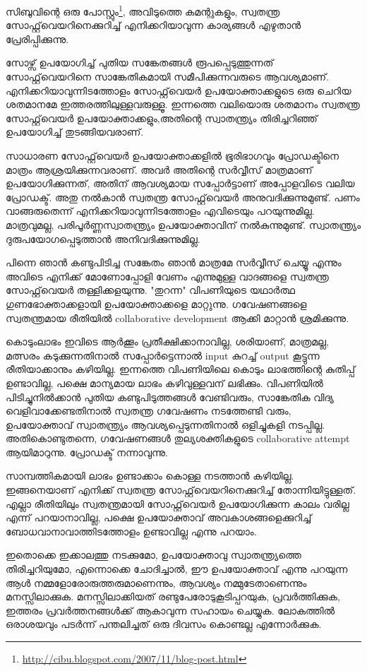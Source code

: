 \vskip 2pt

സിബുവിന്റെ ഒരു പോസ്റ്റും\footnote{\url{http://cibu.blogspot.com/2007/11/blog-post.html}}, അവിടുത്തെ കമന്റുകളും, സ്വതന്ത്ര സോഫ്റ്റ്‌വെയറിനെക്കുറിച്ച് എനിക്കറിയാവുന്ന കാര്യങ്ങള്‍ എഴുതാന്‍ പ്രേരിപ്പിക്കുന്നു.

സോഴ്സ് ഉപയോഗിച്ച് പുതിയ സങ്കേതങ്ങള്‍ രൂപപ്പെടുത്തുന്നത് സോഫ്റ്റ്‌വെയറിനെ സാങ്കേതികമായി സമീപിക്കുന്നവരുടെ ആവശ്യമാണ്. എനിക്കറിയാവുന്നിടത്തോളം സോഫ്റ്റ്‌വെയര്‍ ഉപയോക്താക്കളുടെ ഒരു ചെറിയ ശതമാനമേ ഇത്തരത്തിലുള്ളവരുള്ളൂ. ഇന്നത്തെ വലിയൊരു ശതമാനം സ്വതന്ത്ര സോഫ്റ്റ്‌വെയര്‍ ഉപയോക്താക്കളും,അതിന്റെ സ്വാതന്ത്ര്യം തിരിച്ചറിഞ്ഞ് ഉപയോഗിച്ച് തുടങ്ങിയവരാണ്.

സാധാരണ സോഫ്റ്റ്‌വെയര്‍ ഉപയോക്താക്കളില്‍ ഭൂരിഭാഗവും പ്രോഡക്ടിനെ മാത്രം ആശ്രയിക്കുന്നവരാണ്. അവര്‍ അതിന്റെ സര്‍വ്വീസ് മാത്രമാണ് ഉപയോഗിക്കുന്നത്, അതിന് ആവശ്യമായ സപ്പോര്‍ട്ടാണ് അപ്പോളവിടെ വലിയ പ്രോഡക്ട്. അതു നല്‍കാന്‍ സ്വതന്ത്ര സോഫ്റ്റ്‌വെയര്‍ അനുവദിക്കുന്നുമുണ്ട്. പണം വാങ്ങരുതെന്ന് എനിക്കറിയാവുന്നിടത്തോളം എവിടെയും പറയുന്നുമില്ല. മാത്രവുമല്ല, പരിപൂര്‍ണ്ണസ്വാതന്ത്ര്യം ഉപയോക്താവിന് നല്‍കുന്നുമുണ്ട്. സ്വാതന്ത്ര്യം ദുരുപയോഗപ്പെടുത്താന്‍ അനിവദിക്കുന്നുമില്ല.

പിന്നെ ഞാന്‍ കണ്ടുപിടിച്ച സങ്കേതം ഞാന്‍ മാത്രമേ സര്‍വ്വീസ് ചെയ്യൂ എന്നും അവിടെ എനിക്ക് മോണോപ്പോളി വേണം എന്നുമുള്ള വാദങ്ങളെ സ്വതന്ത്ര സോഫ്റ്റ്‌വെയര്‍ തള്ളിക്കളയുന്നു. "തുറന്ന" വിപണിയുടെ യഥാര്‍ത്ഥ ഗുണഭോക്താക്കളായി ഉപയോക്താക്കളെ മാറ്റുന്നു. ഗവേഷണങ്ങളെ സ്വതന്ത്രമായ രീതിയില്‍ collaborative development ആക്കി മാറ്റാന്‍ ശ്രമിക്കുന്നു.

കൊടുംലാഭം ഇവിടെ ആര്‍ക്കൂം പ്രതീക്ഷിക്കാനാവില്ല, ശരിയാണ്, മാത്രമല്ല, മത്സരം കടുക്കുന്നതിനാല്‍ സപ്പോര്‍ട്ടെന്നാല്‍ input കുറച്ച് output കൂട്ടുന്ന രീതിയാക്കാനും കഴിയില്ല. ഇന്നത്തെ വിപണിയിലെ കൊടും ലാഭത്തിന്റെ കുതിപ്പ് ഉണ്ടാവില്ല, പക്ഷെ മാന്യമായ ലാഭം കഴിവുള്ളവന് ലഭിക്കും. വിപണിയില്‍ പിടിച്ചുനില്‍ക്കാന്‍ പുതിയ കണ്ടുപിടുത്തങ്ങള്‍ വേണ്ടിവരും, സാങ്കേതിക വിദ്യ വെളിവാക്കേണ്ടതിനാല്‍ സ്വതന്ത്ര ഗവേഷണം നടത്തേണ്ടി വരും, ഉപയോക്താവ് സ്വാതന്ത്ര്യം ആവശ്യപ്പെടുന്നതിനാല്‍ ഒളിച്ചുകളി നടപ്പില്ല. അതികൊണ്ടുതന്നെ, ഗവേഷണങ്ങള്‍ തുല്യശക്തികളുടെ collaborative attempt ആയിമാറുന്നു. പ്രോഡക്ട് നന്നാവുന്നു.

സാമ്പത്തികമായി ലാഭം ഉണ്ടാക്കാം കൊള്ള നടത്താന്‍ കഴിയില്ല. ഇങ്ങനെയാണ് എനിക്ക് സ്വതന്ത്ര സോഫ്റ്റ്‌വെയറിനെക്കുറിച്ച് തോന്നിയിട്ടുള്ളത്. എല്ലാ രീതിയിലും സ്വതന്ത്രമായി സോഫ്റ്റ്‌‌വെയര്‍ ഉപയോഗിക്കുന്ന കാലം വരില്ല എന്ന് പറയാനാവില്ല, പക്ഷെ ഉപയോക്താവ് അവകാശങ്ങളെക്കുറിച്ച് ബോധവാനാവാത്തിടത്തോളം ഉണ്ടാവില്ല എന്നു പറയാം.

ഇതൊക്കെ ഇക്കാലത്തു നടക്കുമോ, ഉപയോക്താവു സ്വാതന്ത്ര്യത്തെ തിരിച്ചറിയുമോ, എന്നൊക്കെ ചോദിച്ചാല്‍, ഈ ഉപയോക്താവ് എന്നു പറയുന്ന ആള്‍ നമ്മളോരോരുത്തരുമാണെന്നും, ആവശ്യം നമ്മുടേതാണെന്നും മനസ്സിലാക്കുക. മനസ്സിലാക്കിയത് രണ്ടുപേരോടുകൂടിപ്പറയുക, പ്രവര്‍ത്തിക്കുക, ഇത്തരം പ്രവര്‍ത്തനങ്ങള്‍ക്ക് ആകാവുന്ന സഹായം ചെയ്യുക. ലോകത്തില്‍ ഒരാശയവും പടര്‍ന്ന് പന്തലിച്ചത് ഒരു ദിവസം കൊണ്ടല്ല എന്നോര്‍ക്കുക.

